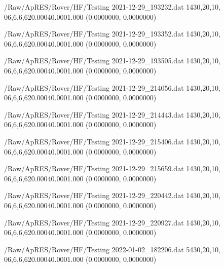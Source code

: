 \hfaprestable
{/Raw/ApRES/Rover/HF/Testing}%
{2021-12-29\_193232.dat}%
{1}{4}{30,20,10, 0}{6,6,6,6}{20.000}{40.000}{1.000}%
{ (0.0000000, 0.0000000)}%
{}%
{}%

\hfaprestable
{/Raw/ApRES/Rover/HF/Testing}%
{2021-12-29\_193352.dat}%
{1}{4}{30,20,10, 0}{6,6,6,6}{20.000}{40.000}{1.000}%
{ (0.0000000, 0.0000000)}%
{}%
{}%

\hfaprestable
{/Raw/ApRES/Rover/HF/Testing}%
{2021-12-29\_193505.dat}%
{1}{4}{30,20,10, 0}{6,6,6,6}{20.000}{40.000}{1.000}%
{ (0.0000000, 0.0000000)}%
{}%
{}%

\hfaprestable
{/Raw/ApRES/Rover/HF/Testing}%
{2021-12-29\_214056.dat}%
{1}{4}{30,20,10, 0}{6,6,6,6}{20.000}{40.000}{1.000}%
{ (0.0000000, 0.0000000)}%
{}%
{}%

\hfaprestable
{/Raw/ApRES/Rover/HF/Testing}%
{2021-12-29\_214443.dat}%
{1}{4}{30,20,10, 0}{6,6,6,6}{20.000}{40.000}{1.000}%
{ (0.0000000, 0.0000000)}%
{}%
{}%

\hfaprestable
{/Raw/ApRES/Rover/HF/Testing}%
{2021-12-29\_215406.dat}%
{1}{4}{30,20,10, 0}{6,6,6,6}{20.000}{40.000}{1.000}%
{ (0.0000000, 0.0000000)}%
{}%
{}%

\hfaprestable
{/Raw/ApRES/Rover/HF/Testing}%
{2021-12-29\_215659.dat}%
{1}{4}{30,20,10, 0}{6,6,6,6}{20.000}{40.000}{1.000}%
{ (0.0000000, 0.0000000)}%
{}%
{}%

\hfaprestable
{/Raw/ApRES/Rover/HF/Testing}%
{2021-12-29\_220442.dat}%
{1}{4}{30,20,10, 0}{6,6,6,6}{20.000}{40.000}{1.000}%
{ (0.0000000, 0.0000000)}%
{}%
{}%

\hfaprestable
{/Raw/ApRES/Rover/HF/Testing}%
{2021-12-29\_220927.dat}%
{1}{4}{30,20,10, 0}{6,6,6,6}{20.000}{40.000}{1.000}%
{ (0.0000000, 0.0000000)}%
{}%
{}%

\hfaprestable
{/Raw/ApRES/Rover/HF/Testing}%
{2022-01-02\_182206.dat}%
{5}{4}{30,20,10, 0}{6,6,6,6}{20.000}{40.000}{1.000}%
{ (0.0000000, 0.0000000)}%
{}%
{}%

